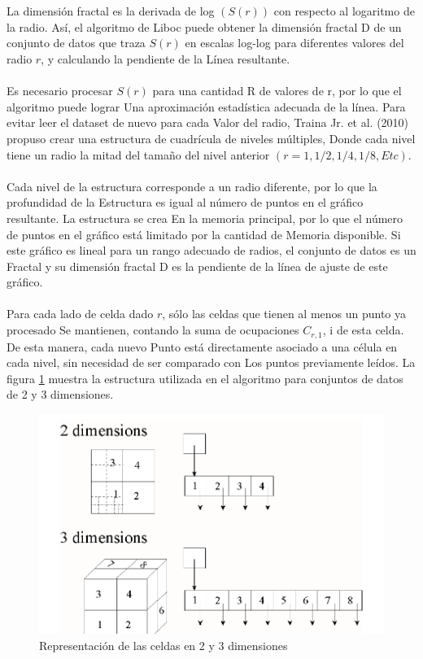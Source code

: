 \\\\

La dimensión fractal es la derivada de log $(S (r))$ con respecto al logaritmo de la
radio. Así, el algoritmo de Liboc puede obtener la dimensión fractal D de un conjunto de datos que traza
$S(r)$ en escalas log-log para diferentes valores del radio $r$, y calculando la pendiente de la
Línea resultante.
\\\\

Es necesario procesar $S(r)$ para una cantidad R de valores de r, por lo que el algoritmo puede lograr
Una aproximación estadística adecuada de la línea. Para evitar leer el dataset de nuevo para cada
Valor del radio, Traina Jr. et al. (2010) propuso crear una estructura de cuadrícula de niveles múltiples,
Donde cada nivel tiene un radio la mitad del tamaño del nivel anterior $(r = 1, 1/2, 1/4, 1/8, Etc). $
\\\\

Cada nivel de la estructura corresponde a un radio diferente, por lo que la profundidad de la
Estructura es igual al número de puntos en el gráfico resultante. La estructura se crea
En la memoria principal, por lo que el número de puntos en el gráfico está limitado por la cantidad de
Memoria disponible. Si este gráfico es lineal para un rango adecuado de radios, el conjunto de datos es un
Fractal y su dimensión fractal D es la pendiente de la línea de ajuste de este gráfico.
\\\\

Para cada lado de celda dado $r$, sólo las celdas que tienen al menos un punto ya procesado
Se mantienen, contando la suma de ocupaciones $ C_{r,1}$, i de esta celda. De esta manera, cada nuevo
Punto está directamente asociado a una célula en cada nivel, sin necesidad de ser comparado con
Los puntos previamente leídos. La figura \ref{fig:ima5} muestra la estructura utilizada en el algoritmo para conjuntos de datos de 2 y 3 dimensiones.

\begin{figure}[h]
\centering
\includegraphics[scale=1.2]{chapter4/ima5.png}
\caption{Representación de las celdas en 2 y 3 dimensiones }
\label{fig:ima5}
\end{figure}
\\\\



